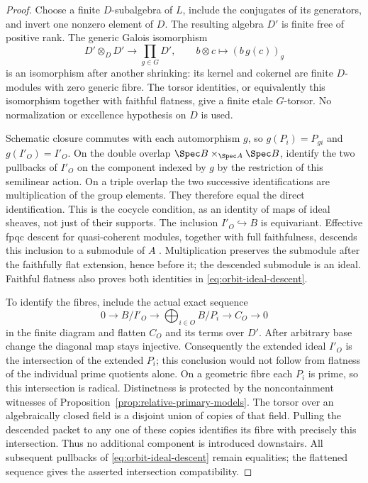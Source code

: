 \begin{proof}
Choose a finite \(D\)-subalgebra of \(L\), include the conjugates
of its generators, and invert one nonzero element of \(D\).
The resulting algebra \(D'\) is finite free of positive rank.
The generic Galois isomorphism
\[
 D'\otimes_DD'\longrightarrow\prod_{g\in G}D',
 \qquad b\otimes c\longmapsto(b\,g(c))_g
\]
is an isomorphism after another shrinking: its kernel and cokernel
are finite \(D\)-modules with zero generic fibre.  The torsor
identities, or equivalently this isomorphism together with faithful
flatness, give a finite etale \(G\)-torsor.  No normalization or
excellence hypothesis on \(D\) is used.

Schematic closure commutes with each automorphism \(g\), so
\(g(P_i)=P_{g i}\) and \(g(I'_O)=I'_O\).  On the double overlap
\(\Spec B\times_{\Spec A}\Spec B\), identify the two pullbacks
of \(I'_O\) on the component indexed by \(g\) by the restriction
of this semilinear action.  On a triple overlap the two successive
identifications are multiplication of the group elements.  They
therefore equal the direct identification.  This is the cocycle
condition, as an identity of maps of ideal sheaves, not just of their
supports.  The inclusion \(I'_O\hookrightarrow B\) is equivariant.
Effective fpqc descent for quasi-coherent modules, together with full
faithfulness, descends this inclusion to a submodule of \(A\)
\cite[Tag 023T and Section 35.6]{StacksDescent}.  Multiplication
preserves the submodule after the faithfully flat extension, hence
before it; the descended submodule is an ideal.  Faithful flatness
also proves both identities in \eqref{eq:orbit-ideal-descent}.

To identify the fibres, include the actual exact sequence
\begin{equation}\label{eq:intersection-diagonal-descent}
 0\longrightarrow B/I'_O\longrightarrow
 \bigoplus_{i\in O}B/P_i\longrightarrow C_O\longrightarrow0
\end{equation}
in the finite diagram and flatten \(C_O\) and its terms over
\(D'\).  After arbitrary base change the diagonal map stays
injective.  Consequently the extended ideal \(I'_O\) is the
intersection of the extended \(P_i\); this conclusion would not
follow from flatness of the individual prime quotients alone.  On a
geometric fibre each \(P_i\) is prime, so this intersection is
radical.  Distinctness is protected by the noncontainment witnesses of
Proposition~\ref{prop:relative-primary-models}.  The torsor over an
algebraically closed field is a disjoint union of copies of that field.
Pulling the descended packet to any one of these copies identifies
its fibre with precisely this intersection.  Thus no additional
component is introduced downstairs.  All subsequent pullbacks of
\eqref{eq:orbit-ideal-descent} remain equalities; the flattened
sequence gives the asserted intersection compatibility.
\end{proof}

